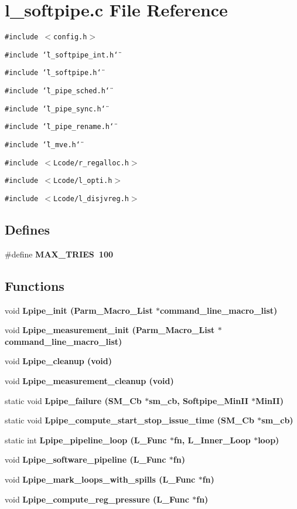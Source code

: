 \section{l\_\-softpipe.c File Reference}
\label{l__softpipe_8c}
{\tt \#include $<$config.h$>$}\par
{\tt \#include \char`\"{}l\_\-softpipe\_\-int.h\char`\"{}}\par
{\tt \#include \char`\"{}l\_\-softpipe.h\char`\"{}}\par
{\tt \#include \char`\"{}l\_\-pipe\_\-sched.h\char`\"{}}\par
{\tt \#include \char`\"{}l\_\-pipe\_\-sync.h\char`\"{}}\par
{\tt \#include \char`\"{}l\_\-pipe\_\-rename.h\char`\"{}}\par
{\tt \#include \char`\"{}l\_\-mve.h\char`\"{}}\par
{\tt \#include $<$Lcode/r\_\-regalloc.h$>$}\par
{\tt \#include $<$Lcode/l\_\-opti.h$>$}\par
{\tt \#include $<$Lcode/l\_\-disjvreg.h$>$}\par
\subsection*{Defines}
\begin{CompactItemize}
\item 
\#define \bf{MAX\_\-TRIES}~100
\end{CompactItemize}
\subsection*{Functions}
\begin{CompactItemize}
\item 
void \bf{Lpipe\_\-init} (Parm\_\-Macro\_\-List $\ast$command\_\-line\_\-macro\_\-list)
\item 
void \bf{Lpipe\_\-measurement\_\-init} (Parm\_\-Macro\_\-List $\ast$command\_\-line\_\-macro\_\-list)
\item 
void \bf{Lpipe\_\-cleanup} (void)
\item 
void \bf{Lpipe\_\-measurement\_\-cleanup} (void)
\item 
static void \bf{Lpipe\_\-failure} (\bf{SM\_\-Cb} $\ast$sm\_\-cb, Softpipe\_\-Min\-II $\ast$Min\-II)
\item 
static void \bf{Lpipe\_\-compute\_\-start\_\-stop\_\-issue\_\-time} (\bf{SM\_\-Cb} $\ast$sm\_\-cb)
\item 
static int \bf{Lpipe\_\-pipeline\_\-loop} (L\_\-Func $\ast$fn, L\_\-Inner\_\-Loop $\ast$loop)
\item 
void \bf{Lpipe\_\-software\_\-pipeline} (L\_\-Func $\ast$fn)
\item 
void \bf{Lpipe\_\-mark\_\-loops\_\-with\_\-spills} (L\_\-Func $\ast$fn)
\item 
void \bf{Lpipe\_\-compute\_\-reg\_\-pressure} (L\_\-Func $\ast$fn)
\end{CompactItemize}
